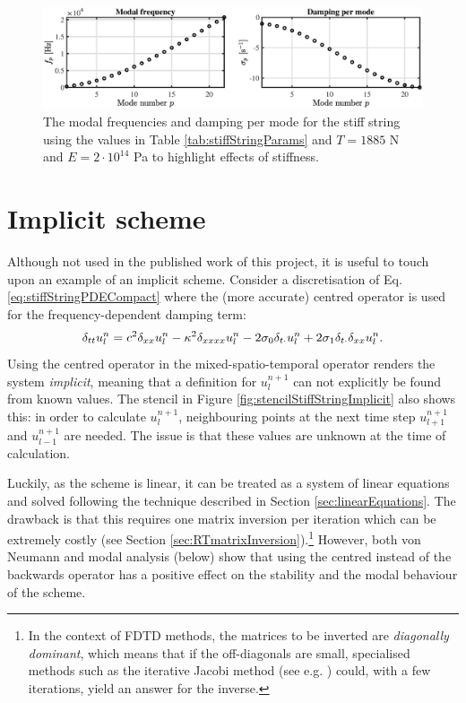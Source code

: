 {\begin{figure}[t]
    \centering
    \includegraphics[width=\textwidth]{figures/resonators/modesStiffString.eps}
    \caption{The modal frequencies and damping per mode for the stiff string using the values in Table \ref{tab:stiffStringParams} and $T = 1885$ N and $E = 2\cdot 10^{14}$ Pa to highlight effects of stiffness. %
    \label{fig:modesStiffString}}
\end{figure}

\section{Implicit scheme}\label{sec:implicitStiffString}
Although not used in the published work of this project, it is useful to touch upon an example of an implicit scheme. Consider a discretisation of Eq. \eqref{eq:stiffStringPDECompact} where the (more accurate) centred operator is used for the frequency-dependent damping term:
\begin{equation}\label{eq:stiffStringFDSImplicit}
    \delta_{tt} u_l^n = c^2 \delta_{xx} u_l^n - \kappa^2 \delta_{xxxx} u_l^n - 2 \sigma_{0} \delta_{t\cdot} u_l^n + 2 \sigma_{1}\delta_{t\cdot}\delta_{xx} u_l^n.
\end{equation}
Using the centred operator in the mixed-spatio-temporal operator renders the system \textit{implicit}, meaning that a definition for $u_l^{n+1}$ can not explicitly be found from known values. The stencil in Figure \ref{fig:stencilStiffStringImplicit} also shows this: in order to calculate $u_l^{n+1}$, neighbouring points at the next time step $u_{l+1}^{n+1}$ and $u_{l-1}^{n+1}$ are needed. The issue is that these values are unknown at the time of calculation.

Luckily, as the scheme is linear, it can be treated as a system of linear equations and solved following the technique described in Section \ref{sec:linearEquations}. The drawback is that this requires one matrix inversion per iteration which can be extremely costly (see Section \ref{sec:RTmatrixInversion}).\footnote{In the context of FDTD methods, the matrices to be inverted are \textit{diagonally dominant}, which means that if the off-diagonals are small, specialised methods such as the iterative Jacobi method (see e.g. \cite{Saad2003}) could, with a few iterations, yield an answer for the inverse.} However, both von Neumann and modal analysis (below) show that using the centred instead of the backwards operator has a positive effect on the stability and the modal behaviour of the scheme. 

}

